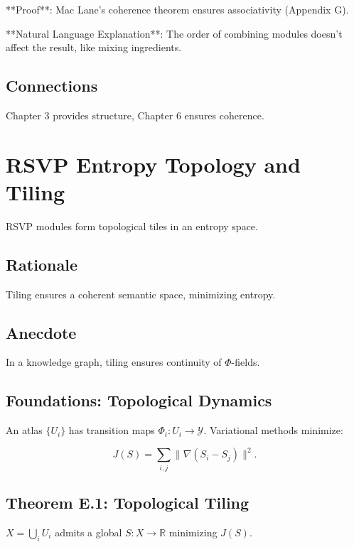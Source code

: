 \documentclass[12pt]{article}
\begin{document}
**Proof**: Mac Lane’s coherence theorem ensures associativity \cite{lurie2009higher} (Appendix G).

**Natural Language Explanation**: The order of combining modules doesn’t affect the result, like mixing ingredients.

\begin{center}
\end{center}

\subsection{Connections}
Chapter 3 provides structure, Chapter 6 ensures coherence.

\section{RSVP Entropy Topology and Tiling}
\label{sec:chapter9}

RSVP modules form topological tiles in an entropy space.

\subsection{Rationale}
Tiling ensures a coherent semantic space, minimizing entropy.

\subsection{Anecdote}
In a knowledge graph, tiling ensures continuity of $\Phi$-fields.

\subsection{Foundations: Topological Dynamics}
An atlas $\{ U_i \}$ has transition maps $\Phi_i : U_i \to \mathcal{Y}$. Variational methods minimize:

\[
J(S) = \sum_{i,j} \|\nabla (S_i - S_j)\|^2.
\]

\subsection{Theorem E.1: Topological Tiling}
$X = \bigcup_i U_i$ admits a global $S : X \to \mathbb{R}$ minimizing $J(S)$.
\end{document}
